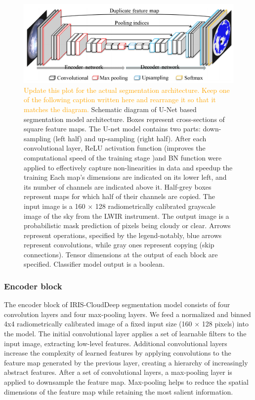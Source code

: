 \documentclass[amt, article]{copernicus}
\begin{document}
\begin{figure}[t]
	\includegraphics[width=\hsize]{figures/schematics_segmentation_model.png}
	\caption{\textcolor{orange}{Update this plot for the actual segmentation architecture. Keep one of the following caption written here and rearrange it so that it matches the diagram.}
		Schematic diagram of U-Net based segmentation model architecture. Boxes represent cross-sections of square feature maps. The U-net model contains two parts: down-sampling (left half) and up-sampling (right half). After each convolutional layer, ReLU activation function (improves the computational speed of the training stage )and BN function were applied to effectively capture non-linearities in data and speedup the training
        Each map's dimensions are indicated on its lower left, and its number of channels are indicated above it. Half-grey boxes represent maps for which half of their channels are copied. The input image is a 160 × 128 radiometrically calibrated grayscale image of the sky from the LWIR instrument. The output image is a probabilistic mask prediction of pixels being cloudy or clear. Arrows represent operations, specified by the legend-notably, blue arrows represent convolutions, while gray ones represent copying (skip connections). Tensor dimensions at the output of each block are specified. Classifier model output is a boolean.}
    \label{fig:schematics_segmentation_model}
\end{figure}

\subsubsection{Encoder block}

The encoder block of IRIS-CloudDeep segmentation model consists of four convolution layers and four max-pooling layers. We feed a normalized and binned 4x4 radiometrically calibrated image of a fixed input size (160 × 128 pixels) into the model.
The initial convolutional layer applies a set of learnable filters to the input image, extracting low-level features. Additional convolutional layers increase the complexity of learned features by applying convolutions to the feature map generated by the previous layer, creating a hierarchy of increasingly abstract features. After a set of convolutional layers, a max-pooling layer is applied to downsample the feature map. Max-pooling helps to reduce the spatial dimensions of the feature map while retaining the most salient information.
\end{document}
